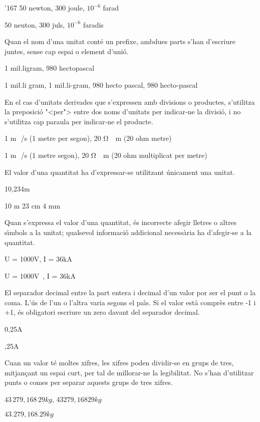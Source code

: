\begin{dinglist}{'167}
\textcolor{Green}{} 50 newton, 300 joule, $10^{-6}$ farad

\textcolor{Red}{}  50 neuton, 300 juls, $10^{-6}$ faradis

 \item Quan el nom d'una unitat
cont\'{e} un prefixe, ambdues parts s'han d'escriure juntes, sense cap espai o element d'uni\'{o}.

\textcolor{Green}{} 1 mi{\l.l}igram, 980 hectopascal

\textcolor{Red}{} 1 mi{\l.l}i gram, 1 mi{\l.l}i-gram, 980 hecto pascal, 980 hecto-pascal

\item En el cas  d'unitats derivades que s'expressen amb divisions o
productes, s'utilitza la preposici\'{o} {"<}per{">} entre dos noms d'unitats
per indicar-ne la divisi\'{o}, i no s'utilitza cap paraula per indicar-ne el
producte.

\textcolor{Green}{} 1 \unit{m\,/s} (1 metre per segon), 20 \unit{\ohm\cdot m} (20 ohm metre)

\textcolor{Red}{}  1 \unit{m\,/s} (1 metre segon), 20 \unit{\ohm\cdot m} (20 ohm multiplicat per metre)

\item El valor d'una quantitat ha d'expressar-se  utilitzant \'{u}nicament una
unitat.

\textcolor{Green}{} 10,234\unit{m}

\textcolor{Red}{}  10 m 23 cm 4 mm

\item Quan s'expressa el valor d'una quantitat, \'{e}s incorrecte afegir
lletres o altres s\'{\i}mbols a la unitat; qualsevol informaci\'{o}
addicional necess\`{a}ria ha d'afegir-se a la quantitat.

\textcolor{Green}{} U = 1000\unit{V},  I = 36\unit{kA}

\textcolor{Red}{}  U = 1000\unit{V},  I = 36\unit{kA}

\item El separador decimal entre la part entera i decimal d'un valor por ser el punt o la coma. L'\'{u}s de l'un o l'altra varia segons el pa\'{\i}s. Si el valor est\`{a} compr\`{e}s entre -1 i +1, \'{e}s obligatori escriure un zero davant del separador decimal.

\textcolor{Green}{} 0,25\unit{A}

\textcolor{Red}{}  ,25\unit{A}

\item Cuan un valor t\'{e} moltes xifres, les xifres poden dividir-se en grups de tres, mitjan\c{c}ant un espai curt, per tal de millorar-ne la legibilitat. No s'han d'utilitzar punts o comes per separar aquests grups de tres xifres.

\textcolor{Green}{} $43\,279{,}168\,29 \unit{kg}$, $43279{,}16829\unit{kg}$

\textcolor{Red}{}  $43.279{,}168.29 \unit{kg}$

\end{dinglist}

